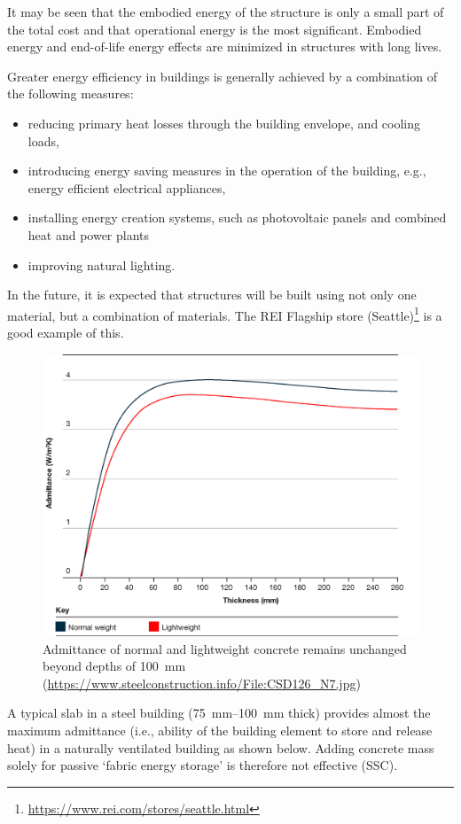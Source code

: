 It may be seen that the embodied energy of the structure is only a small part of the total cost and that operational energy is the most significant. Embodied energy and end-of-life energy effects are minimized in structures with long lives.

Greater energy efficiency in buildings is generally achieved by a combination of the following measures:
\begin{itemize}
\item reducing primary heat losses through the building envelope, and cooling loads,
\item introducing energy saving measures in the operation of the building, e.g., energy efficient electrical appliances,
\item installing energy creation systems, such as photovoltaic panels and combined heat and power plants
\item improving natural lighting.
\end{itemize}

In the future, it is expected that structures will be built using not only one material, but a combination of materials. The REI Flagship store (Seattle)\footnote{\url{https://www.rei.com/stores/seattle.html}} is a good example of this.

\begin{figure}[H]
\centering
\includegraphics[scale=.7]{PIC/CH02/ADMITTANCE}
\caption{Admittance of normal and lightweight concrete remains unchanged beyond depths of \SI{100}{\mm} (\href{https://www.steelconstruction.info/File:CSD126_N7.jpg}{\url{https://www.steelconstruction.info/File:CSD126_N7.jpg}})}
\end{figure}
A typical slab in a steel building (\SIrange{75}{100}{\mm} thick) provides almost the maximum admittance (i.e., ability of the building element to store and release heat) in a naturally ventilated building as shown below. Adding concrete mass solely for passive `fabric energy storage' is therefore not effective (SSC).


